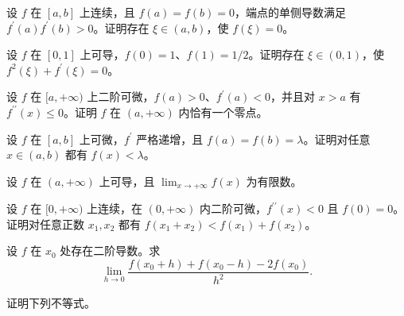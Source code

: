\noindent\begin{minipage}{\textwidth}
设 $f$ 在 $[a,b]$ 上连续，且 $f(a)=f(b)=0$，端点的单侧导数满足 $f^{\prime}(a)f^{\prime}(b)>0$。证明存在 $\xi\in(a,b)$，使 $f(\xi)=0$。
\end{minipage}\par\vfill
\newpage
\noindent\begin{minipage}{\textwidth}
设 $f$ 在 $[0,1]$ 上可导，$f(0)=1$、$f(1)=1/2$。证明存在 $\xi\in(0,1)$，使 $f^2(\xi)+f^{\prime}(\xi)=0$。
\end{minipage}\par\vfill
\noindent\begin{minipage}{\textwidth}
设 $f$ 在 $[a,+\infty)$ 上二阶可微，$f(a)>0$、$f^{\prime}(a)<0$，并且对 $x>a$ 有 $f^{\prime\prime}(x)\le0$。证明 $f$ 在 $(a,+\infty)$ 内恰有一个零点。
\end{minipage}\par\vfill
\noindent\begin{minipage}{\textwidth}
设 $f$ 在 $[a,b]$ 上可微，$f^{\prime}$ 严格递增，且 $f(a)=f(b)=\lambda$。证明对任意 $x\in(a,b)$ 都有 $f(x)<\lambda$。
\end{minipage}\par\vfill
\noindent\begin{minipage}{\textwidth}
设 $f$ 在 $(a,+\infty)$ 上可导，且 $\lim_{x\to+\infty}f(x)$ 为有限数。
\end{minipage}\par\vfill
\newpage
\noindent\begin{minipage}{\textwidth}
设 $f$ 在 $[0,+\infty)$ 上连续，在 $(0,+\infty)$ 内二阶可微，$f^{\prime\prime}(x)<0$ 且 $f(0)=0$。证明对任意正数 $x_1,x_2$ 都有 $f(x_1+x_2)<f(x_1)+f(x_2)$。
\end{minipage}\par\vfill
\noindent\begin{minipage}{\textwidth}
设 $f$ 在 $x_0$ 处存在二阶导数。求\[\lim_{h\to0}\frac{f(x_0+h)+f(x_0-h)-2f(x_0)}{h^2}.\]
\end{minipage}\par\vfill
\noindent\begin{minipage}{\textwidth}
证明下列不等式。
\end{minipage}\par\vfill
